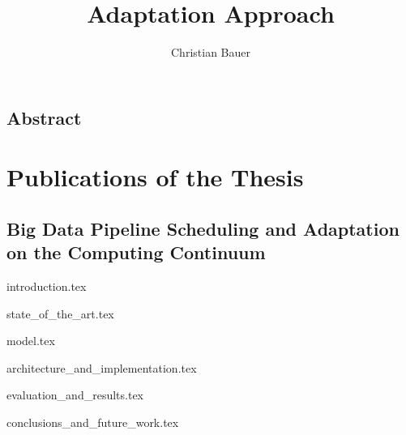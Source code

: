 \documentclass{memoir}
\title{Adaptation Approach}
\author{Christian Bauer}
\begin{document}
  \maketitle

  \tableofcontents
  \listoffigures
  

  \section*{Abstract}

  \chapter*{Publications of the Thesis}

    \section*{Big Data Pipeline Scheduling and Adaptation on the Computing Continuum}

    
    

  {introduction.tex}

  {state_of_the_art.tex}

  {model.tex}

  {architecture_and_implementation.tex}
  
  {evaluation_and_results.tex}

  {conclusions_and_future_work.tex}



  
  
\end{document}
